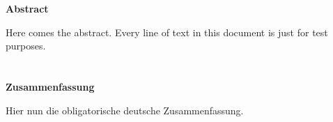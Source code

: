 \chapter*{}
\thispagestyle{empty}

\begin{center}
    \large \textbf{Abstract}
\end{center}

Here comes the abstract. Every line of text in this document is just for test purposes.

\chapter*{}
\thispagestyle{empty}

\begin{center}
    \large \textbf{Zusammenfassung}
\end{center}

Hier nun die obligatorische deutsche Zusammenfassung.
